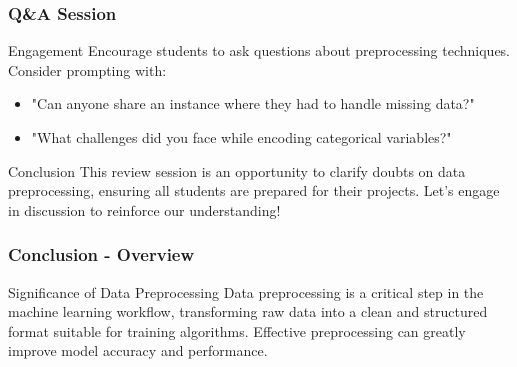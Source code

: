 \documentclass[aspectratio=169]{beamer}
\begin{document}
\begin{frame}[fragile]
    \frametitle{Q\&A Session}
    
    \begin{block}{Engagement}
        Encourage students to ask questions about preprocessing techniques. Consider prompting with:
        \begin{itemize}
            \item "Can anyone share an instance where they had to handle missing data?"
            \item "What challenges did you face while encoding categorical variables?"
        \end{itemize}
    \end{block}
    
    \begin{block}{Conclusion}
        This review session is an opportunity to clarify doubts on data preprocessing, ensuring all students are prepared for their projects. Let's engage in discussion to reinforce our understanding!
    \end{block}
\end{frame}

\begin{frame}[fragile]
    \frametitle{Conclusion - Overview}
    \begin{block}{Significance of Data Preprocessing}
        Data preprocessing is a critical step in the machine learning workflow, transforming raw data into a clean and structured format suitable for training algorithms. Effective preprocessing can greatly improve model accuracy and performance.
    \end{block}
\end{frame}
\end{document}
